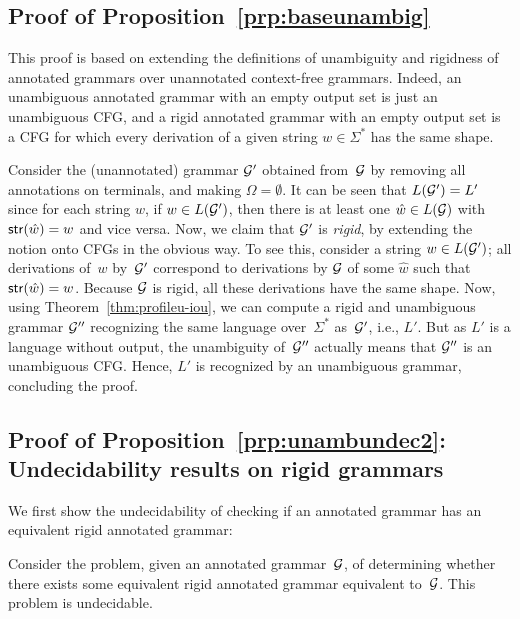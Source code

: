 %
%
%
%
%
%
%
%
%
%
%
%
%
%
%
%
%
%
%
%
%
%
%
%
%
%
%
%
%
%
%
%
%
%
%
%
%
%
%
%
%
%
%
%
%
%
%
%
%
%

\subsection{Proof of Proposition~\ref{prp:baseunambig}}

This proof is based on extending the definitions of unambiguity and rigidness of annotated grammars over unannotated context-free grammars. Indeed, an unambiguous annotated grammar with an empty output set is just an unambiguous CFG, and a rigid annotated grammar with an empty output set is a CFG for which every derivation of a given string $w\in \Sigma^*$ has the same shape.

  Consider the (unannotated) grammar $\mathcal{G}'$ obtained from~$\mathcal{G}$ by removing all
  annotations on terminals, and making $\Omega = \emptyset$. It can be seen that $L(\mathcal{G}') = L'$ since for each string $w$, if $w\in L(\mathcal{G}')$, then there is at least one $\hat{w}\in L(\mathcal{G})$ with $\mathsf{str}(\hat{w}) = w$ and vice versa. Now, we claim that
  $\mathcal{G}'$ is \emph{rigid}, by extending the notion onto CFGs in the obvious way. To see this, consider a string $w \in L(\mathcal{G}')$; all
  derivations of~$w$ by~$\mathcal{G}'$ correspond to derivations by $\mathcal{G}$ of some $\hat{w}$ such that $\mathsf{str}(\hat{w}) =w $. Because $\mathcal{G}$ is rigid, all these derivations have the
  same shape. Now, using Theorem~\ref{thm:profileu-iou}, we can compute a rigid and
  unambiguous grammar $\mathcal{G}''$ recognizing the same language over~$\Sigma^*$
  as~$\mathcal{G}'$, i.e., $L'$. But as $L'$ is a language without output, the
  unambiguity of~$\mathcal{G}''$ actually means that $\mathcal{G}''$ is an unambiguous CFG. Hence, $L'$
  is recognized by an unambiguous grammar, concluding the proof.

\subsection{Proof of Proposition~\ref{prp:unambundec2}: Undecidability results
on rigid grammars}

We first show the undecidability of checking if an annotated grammar has an
equivalent rigid annotated grammar:

\begin{proposition}
  \label{prp:unambundec}
  Consider the problem, given an annotated grammar~$\mathcal{G}$, of determining whether
  there exists some equivalent rigid annotated grammar equivalent to~$\mathcal{G}$.
  This problem is undecidable.
\end{proposition}

